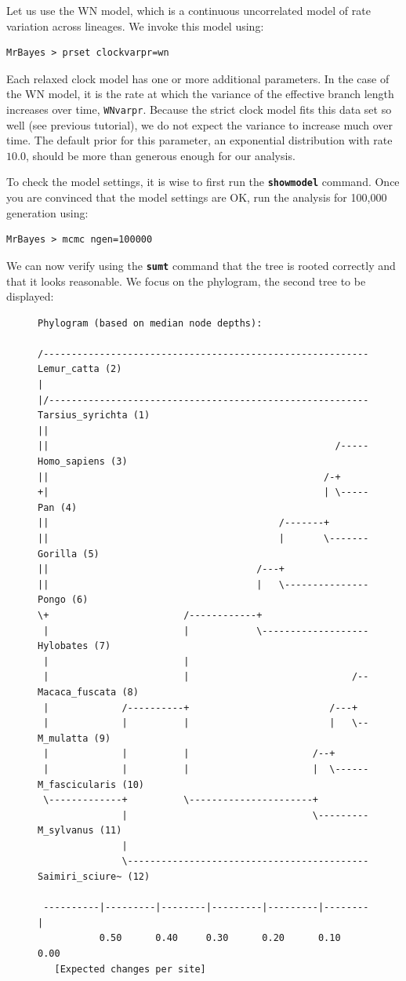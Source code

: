 \documentclass[12pt]{book}
\newcommand{\ttt}[1]{\texttt{#1}}
\newcommand{\tb}[1]{\ttt{\textbf{#1}}}
\begin{document}
Let us use the WN model, which is a continuous uncorrelated model of rate variation across
lineages. We invoke this model using:

\begin{Verbatim}
MrBayes > prset clockvarpr=wn
\end{Verbatim}

Each relaxed clock model has one or more additional parameters. In the case of the WN model, it is
the rate at which the variance of the effective branch length increases over time,
\texttt{WNvarpr}.  Because the strict clock model fits this data set so well (see previous
tutorial), we do not expect the variance to increase much over time. The default prior for this
parameter, an exponential distribution with rate $10.0$, should be more than generous enough for
our analysis.

To check the model settings, it is wise to first run the \tb{showmodel} command. Once you are
convinced that the model settings are OK, run the analysis for 100,000 generation using:

\begin{Verbatim}
MrBayes > mcmc ngen=100000
\end{Verbatim}

We can now verify using the \tb{sumt} command that the tree is rooted correctly and that it
looks reasonable. We focus on the phylogram, the second tree to be displayed:

\begin{figure}[H]
\centering
\begin{BVerbatim}
Phylogram (based on median node depths):

/---------------------------------------------------------- Lemur_catta (2)
|
|/--------------------------------------------------------- Tarsius_syrichta (1)
||
||                                                   /----- Homo_sapiens (3)
||                                                 /-+
+|                                                 | \----- Pan (4)
||                                         /-------+
||                                         |       \------- Gorilla (5)
||                                     /---+
||                                     |   \--------------- Pongo (6)
\+                        /------------+
 |                        |            \------------------- Hylobates (7)
 |                        |
 |                        |                             /-- Macaca_fuscata (8)
 |             /----------+                         /---+
 |             |          |                         |   \-- M_mulatta (9)
 |             |          |                      /--+
 |             |          |                      |  \------ M_fascicularis (10)
 \-------------+          \----------------------+
               |                                 \--------- M_sylvanus (11)
               |
               \------------------------------------------- Saimiri_sciure~ (12)

 ----------|---------|--------|---------|---------|--------|
           0.50      0.40     0.30      0.20      0.10     0.00
   [Expected changes per site]
\end{BVerbatim}
\end{figure}
\end{document}
